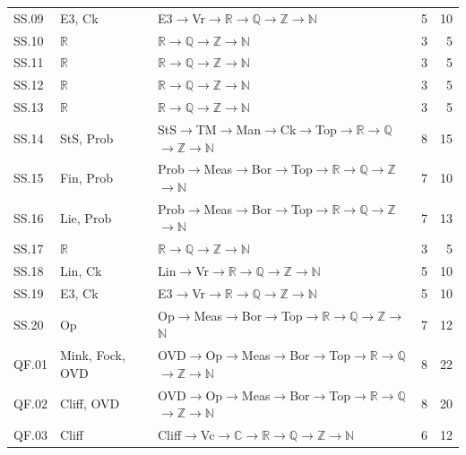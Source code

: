 {\begin{longtable}{l p{4.6cm} p{7.4cm} r r}
SS.09 & \textsf{E3}, \textsf{Ck} & \textsf{E3}$\to$\textsf{Vr}$\to$$\mathbb R$$\to$$\mathbb Q$$\to$$\mathbb Z$$\to$$\mathbb N$ & 5 & 10 \\
SS.10 & $\mathbb R$ & $\mathbb R$$\to$$\mathbb Q$$\to$$\mathbb Z$$\to$$\mathbb N$ & 3 & 5 \\
SS.11 & $\mathbb R$ & $\mathbb R$$\to$$\mathbb Q$$\to$$\mathbb Z$$\to$$\mathbb N$ & 3 & 5 \\
SS.12 & $\mathbb R$ & $\mathbb R$$\to$$\mathbb Q$$\to$$\mathbb Z$$\to$$\mathbb N$ & 3 & 5 \\
SS.13 & $\mathbb R$ & $\mathbb R$$\to$$\mathbb Q$$\to$$\mathbb Z$$\to$$\mathbb N$ & 3 & 5 \\
SS.14 & \textsf{StS}, \textsf{Prob} & \textsf{StS}$\to$\textsf{TM}$\to$\textsf{Man}$\to$\textsf{Ck}$\to$\textsf{Top}$\to$$\mathbb R$$\to$$\mathbb Q$$\to$$\mathbb Z$$\to$$\mathbb N$ & 8 & 15 \\
SS.15 & \textsf{Fin}, \textsf{Prob} & \textsf{Prob}$\to$\textsf{Meas}$\to$\textsf{Bor}$\to$\textsf{Top}$\to$$\mathbb R$$\to$$\mathbb Q$$\to$$\mathbb Z$$\to$$\mathbb N$ & 7 & 10 \\
SS.16 & \textsf{Lie}, \textsf{Prob} & \textsf{Prob}$\to$\textsf{Meas}$\to$\textsf{Bor}$\to$\textsf{Top}$\to$$\mathbb R$$\to$$\mathbb Q$$\to$$\mathbb Z$$\to$$\mathbb N$ & 7 & 13 \\
SS.17 & $\mathbb R$ & $\mathbb R$$\to$$\mathbb Q$$\to$$\mathbb Z$$\to$$\mathbb N$ & 3 & 5 \\
SS.18 & \textsf{Lin}, \textsf{Ck} & \textsf{Lin}$\to$\textsf{Vr}$\to$$\mathbb R$$\to$$\mathbb Q$$\to$$\mathbb Z$$\to$$\mathbb N$ & 5 & 10 \\
SS.19 & \textsf{E3}, \textsf{Ck} & \textsf{E3}$\to$\textsf{Vr}$\to$$\mathbb R$$\to$$\mathbb Q$$\to$$\mathbb Z$$\to$$\mathbb N$ & 5 & 10 \\
SS.20 & \textsf{Op} & \textsf{Op}$\to$\textsf{Meas}$\to$\textsf{Bor}$\to$\textsf{Top}$\to$$\mathbb R$$\to$$\mathbb Q$$\to$$\mathbb Z$$\to$$\mathbb N$ & 7 & 12 \\
QF.01 & \textsf{Mink}, \textsf{Fock}, \textsf{OVD} & \textsf{OVD}$\to$\textsf{Op}$\to$\textsf{Meas}$\to$\textsf{Bor}$\to$\textsf{Top}$\to$$\mathbb R$$\to$$\mathbb Q$$\to$$\mathbb Z$$\to$$\mathbb N$ & 8 & 22 \\
QF.02 & \textsf{Cliff}, \textsf{OVD} & \textsf{OVD}$\to$\textsf{Op}$\to$\textsf{Meas}$\to$\textsf{Bor}$\to$\textsf{Top}$\to$$\mathbb R$$\to$$\mathbb Q$$\to$$\mathbb Z$$\to$$\mathbb N$ & 8 & 20 \\
QF.03 & \textsf{Cliff} & \textsf{Cliff}$\to$\textsf{Vc}$\to$$\mathbb C$$\to$$\mathbb R$$\to$$\mathbb Q$$\to$$\mathbb Z$$\to$$\mathbb N$ & 6 & 12 \\

\end{longtable}}
